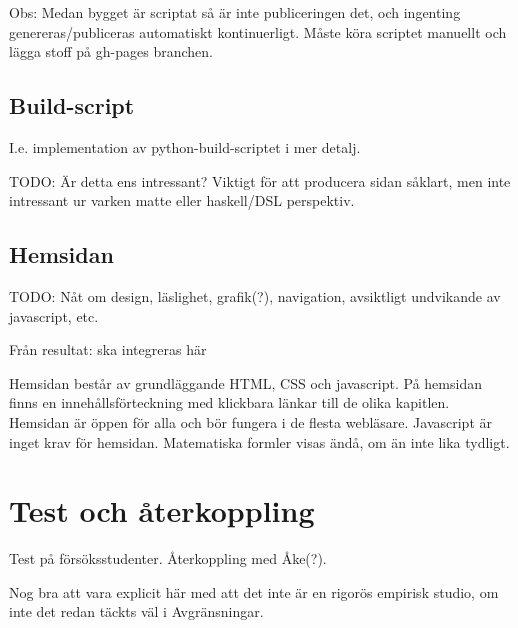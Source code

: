 \begin{binge}
  Obs: Medan bygget är scriptat så är inte publiceringen det, och
  ingenting genereras/publiceras automatiskt kontinuerligt. Måste köra
  scriptet manuellt och lägga stoff på gh-pages branchen.

  \subsection{Build-script}

  I.e. implementation av python-build-scriptet i mer detalj.

  TODO: Är detta ens intressant? Viktigt för att producera sidan såklart, men
  inte intressant ur varken matte eller haskell/DSL perspektiv.

  \subsection{Hemsidan}

  TODO: Nåt om design, läslighet, grafik(?), navigation, avsiktligt undvikande
  av javascript, etc.

Från resultat: ska integreras här

Hemsidan består av grundläggande HTML, CSS och javascript. På hemsidan finns en innehållsförteckning med klickbara länkar till de olika kapitlen. Hemsidan är öppen för alla och bör fungera i de flesta webläsare. Javascript är inget krav för hemsidan. Matematiska formler visas ändå, om än inte lika tydligt.

  \section{Test och återkoppling}


  Test på försöksstudenter. Återkoppling med Åke(?).

  Nog bra att vara explicit här med att det inte är en rigorös empirisk
  studio, om inte det redan täckts väl i Avgränsningar.

\end{binge}
